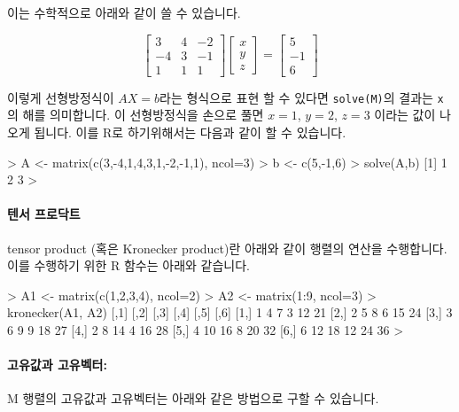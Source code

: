 이는 수학적으로 아래와 같이 쓸 수 있습니다. 

\begin{equation}
	\begin{bmatrix}
		3 & 4 & -2 \\
		-4 & 3 & -1 \\
		1 & 1 & 1 
	\end{bmatrix}
\begin{bmatrix}
	x \\
	y \\
	z 
\end{bmatrix}
= 
\begin{bmatrix}
	5 \\
	-1 \\
	6 
\end{bmatrix}
\end{equation}

이렇게 선형방정식이 $AX=b$라는 형식으로 표현 할 수 있다면 \texttt{solve(M)}의 결과는 \texttt{x}의 해를 의미합니다.
이 선형방정식을 손으로 풀면 $x=1$, $y=2$, $z=3$ 이라는 값이 나오게 됩니다. 
이를 R로 하기위해서는 다음과 같이 할 수 있습니다. 

\begin{Schunk}
\begin{Soutput}
> A <- matrix(c(3,-4,1,4,3,1,-2,-1,1), ncol=3)
> b <- c(5,-1,6)
> solve(A,b)
[1] 1 2 3
> 
\end{Soutput}
\end{Schunk}

\paragraph{텐서 프로닥트}  tensor product (혹은 Kronecker product)란 아래와 같이 행렬의 연산을 수행합니다. 
이를 수행하기 위한 R 함수는 아래와 같습니다. 

\begin{Schunk}
\begin{Soutput}
> A1 <- matrix(c(1,2,3,4), ncol=2)
> A2 <- matrix(1:9, ncol=3)
> kronecker(A1, A2)
     [,1] [,2] [,3] [,4] [,5] [,6]
[1,]    1    4    7    3   12   21
[2,]    2    5    8    6   15   24
[3,]    3    6    9    9   18   27
[4,]    2    8   14    4   16   28
[5,]    4   10   16    8   20   32
[6,]    6   12   18   12   24   36
> 	
\end{Soutput}
\end{Schunk}

\paragraph{고유값과 고유벡터:}  M 행렬의 고유값과 고유벡터는 아래와 같은 방법으로 구할 수 있습니다. 

